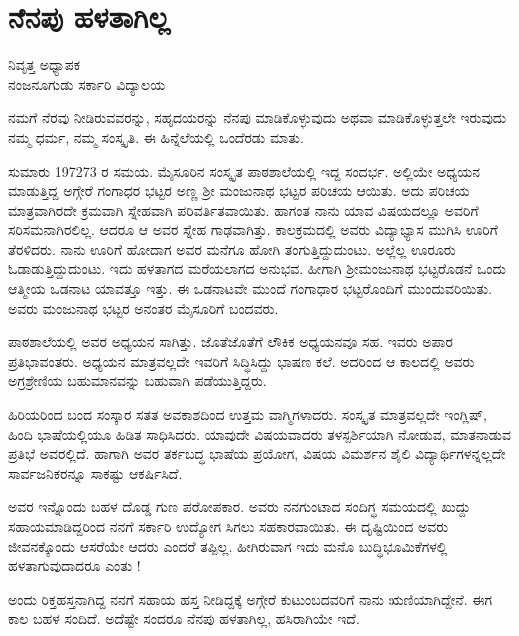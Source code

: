 {\fontsize{14}{16}\selectfont
\chapter{ನೆನಪು ಹಳತಾಗಿಲ್ಲ}

\begin{center}
\smallskip

ನಿವೃತ್ತ ಅಧ್ಯಾಪಕ\\
ನಂಜನೂಗುಡು ಸರ್ಕಾರಿ ವಿದ್ಯಾಲಯ
\addrule
\end{center}

ನಮಗೆ ನೆರವು ನೀಡಿರುವವರನ್ನು, ಸಹೃದಯರನ್ನು ನೆನಪು ಮಾಡಿಕೊಳ್ಳುವುದು ಅಥವಾ ಮಾಡಿಕೊಳ್ಳುತ್ತಲೇ ಇರುವುದು ನಮ್ಮ ಧರ್ಮ, ನಮ್ಮ ಸಂಸ್ಕೃತಿ. ಈ ಹಿನ್ನೆಲೆಯಲ್ಲಿ ಒಂದೆರಡು ಮಾತು.
\vskip 2pt

ಸುಮಾರು 1972\enginline{-}73 ರ ಸಮಯ. ಮೈಸೂರಿನ ಸಂಸ್ಕೃತ ಪಾಠಶಾಲೆಯಲ್ಲಿ ಇದ್ದ ಸಂದರ್ಭ. ಅಲ್ಲಿಯೇ ಅಧ್ಯಯನ ಮಾಡುತ್ತಿದ್ದ ಅಗ್ಗೇರೆ ಗಂಗಾಧರ ಭಟ್ಟರ ಅಣ್ಣ ಶ್ರೀ ಮಂಜುನಾಥ ಭಟ್ಟರ ಪರಿಚಯ ಆಯಿತು. ಅದು ಪರಿಚಯ ಮಾತ್ರವಾಗಿರದೇ ಕ್ರಮವಾಗಿ ಸ್ನೇಹವಾಗಿ ಪರಿವರ್ತಿತವಾಯಿತು. ಹಾಗಂತ ನಾನು ಯಾವ ವಿಷಯದಲ್ಲೂ ಅವರಿಗೆ ಸರಿಸಮನಾಗಿರಲಿಲ್ಲ. ಆದರೂ ಆ ಅವರ ಸ್ನೇಹ ಗಾಢವಾಗಿತ್ತು. ಕಾಲಕ್ರಮದಲ್ಲಿ ಅವರು ವಿದ್ಯಾಭ್ಯಾಸ ಮುಗಿಸಿ ಊರಿಗೆ ತೆರಳಿದರು. ನಾನು ಊರಿಗೆ ಹೋದಾಗ ಅವರ ಮನೆಗೂ ಹೋಗಿ ತಂಗುತ್ತಿದ್ದುದುಂಟು. ಅಲ್ಲೆಲ್ಲ ಊರೂರು ಓಡಾಡುತ್ತಿದ್ದುದುಂಟು. ಇದು ಹಳತಾಗದ   \enginline{-}   ಮರೆಯಲಾಗದ ಅನುಭವ. ಹೀಗಾಗಿ ಶ್ರೀಮಂಜುನಾಥ ಭಟ್ಟರೊಡನೆ ಒಂದು ಆತ್ಮೀಯ ಒಡನಾಟ ಯಾವತ್ತೂ ಇತ್ತು. ಈ ಒಡನಾಟವೇ ಮುಂದೆ ಗಂಗಾಧಾರ ಭಟ್ಟರೊಂದಿಗೆ ಮುಂದುವರಿಯಿತು. ಅವರು ಮಂಜುನಾಥ ಭಟ್ಟರ ಅನಂತರ ಮೈಸೂರಿಗೆ ಬಂದವರು.
\vskip 2pt

ಪಾಠಶಾಲೆಯಲ್ಲಿ ಅವರ ಅಧ್ಯಯನ ಸಾಗಿತ್ತು. ಜೊತೆಜೊತೆಗೆ ಲೌಕಿಕ ಅಧ್ಯಯನವೂ ಸಹ. ಇವರು ಅಪಾರ ಪ್ರತಿಭಾವಂತರು. ಅಧ್ಯಯನ ಮಾತ್ರವಲ್ಲದೇ ಇವರಿಗೆ ಸಿದ್ಧಿಸಿದ್ದು ಭಾಷಣ ಕಲೆ. ಅದರಿಂದ ಆ ಕಾಲದಲ್ಲಿ ಅವರು ಅಗ್ರಶ್ರೇಣಿಯ ಬಹುಮಾನವನ್ನು ಬಹುವಾಗಿ ಪಡೆಯುತ್ತಿದ್ದರು. 
\vskip 2pt

ಹಿರಿಯರಿಂದ ಬಂದ ಸಂಸ್ಕಾರ ಸತತ ಅವಕಾಶದಿಂದ ಉತ್ತಮ ವಾಗ್ಮಿಗಳಾದರು. ಸಂಸ್ಕೃತ ಮಾತ್ರವಲ್ಲದೇ ಇಂಗ್ಲಿಷ್, ಹಿಂದಿ ಭಾಷೆಯಲ್ಲಿಯೂ ಹಿಡಿತ ಸಾಧಿಸಿದರು. ಯಾವುದೇ ವಿಷಯವಾದರು ತಳಸ್ಪರ್ಶಿಯಾಗಿ ನೋಡುವ, ಮಾತನಾಡುವ ಪ್ರತಿಭೆ ಅವರಲ್ಲಿದೆ. ಹಾಗಾಗಿ ಅವರ ತರ್ಕಬದ್ಧ ಭಾಷೆಯ ಪ್ರಯೋಗ, ವಿಷಯ ವಿಮರ್ಶನ ಶೈಲಿ ವಿದ್ಯಾರ್ಥಿಗಳನ್ನಲ್ಲದೇ ಸಾರ್ವಜನಿಕರನ್ನೂ ಸಾಕಷ್ಟು ಆಕರ್ಷಿಸಿದೆ. 

ಅವರ ಇನ್ನೊಂದು ಬಹಳ ದೊಡ್ಡ ಗುಣ ಪರೋಪಕಾರ. ಅವರು ನನಗುಂಟಾದ ಸಂದಿಗ್ಧ ಸಮಯದಲ್ಲಿ  ಖುದ್ದು ಸಹಾಯಮಾಡಿದ್ದರಿಂದ ನನಗೆ ಸರ್ಕಾರಿ ಉದ್ಯೋಗ ಸಿಗಲು ಸಹಕಾರವಾಯಿತು. ಈ ದೃಷ್ಟಿಯಿಂದ ಅವರು ಜೀವನಕ್ಕೊಂದು ಆಸರೆಯೇ ಆದರು ಎಂದರೆ ತಪ್ಪಿಲ್ಲ. ಹೀಗಿರುವಾಗ ಇದು ಮನೊ  \enginline{-}  ಬುದ್ಧಿಭೂಮಿಕೆಗಳಲ್ಲಿ ಹಳತಾಗುವುದಾದರೂ ಎಂತು !

ಅಂದು ರಿಕ್ತಹಸ್ತನಾಗಿದ್ದ ನನಗೆ ಸಹಾಯ ಹಸ್ತ ನೀಡಿದ್ದಕ್ಕೆ ಅಗ್ಗೇರೆ ಕುಟುಂಬದವರಿಗೆ ನಾನು ಋಣಿಯಾಗಿದ್ದೇನೆ. ಈಗ ಕಾಲ ಬಹಳ ಸಂದಿದೆ.  ಅದೆಷ್ಟೇ ಸಂದರೂ ನೆನಪು ಹಳತಾಗಿಲ್ಲ, ಹಸಿರಾಗಿಯೇ ಇದೆ.

\articleend
}
